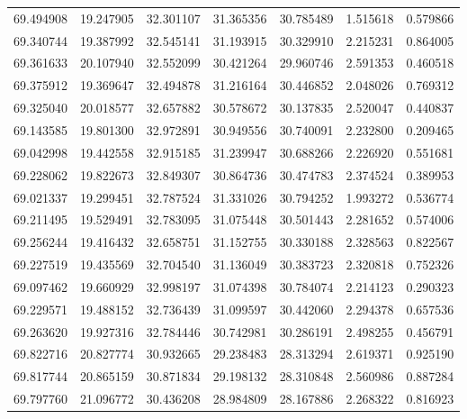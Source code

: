 \begin{tabular}{rrrrrrr}
 69.494908 &  19.247905 &         32.301107 &         31.365356 &         30.785489 &  1.515618 &  0.579866 \\
 69.340744 &  19.387992 &         32.545141 &         31.193915 &         30.329910 &  2.215231 &  0.864005 \\
 69.361633 &  20.107940 &         32.552099 &         30.421264 &         29.960746 &  2.591353 &  0.460518 \\
 69.375912 &  19.369647 &         32.494878 &         31.216164 &         30.446852 &  2.048026 &  0.769312 \\
 69.325040 &  20.018577 &         32.657882 &         30.578672 &         30.137835 &  2.520047 &  0.440837 \\
 69.143585 &  19.801300 &         32.972891 &         30.949556 &         30.740091 &  2.232800 &  0.209465 \\
 69.042998 &  19.442558 &         32.915185 &         31.239947 &         30.688266 &  2.226920 &  0.551681 \\
 69.228062 &  19.822673 &         32.849307 &         30.864736 &         30.474783 &  2.374524 &  0.389953 \\
 69.021337 &  19.299451 &         32.787524 &         31.331026 &         30.794252 &  1.993272 &  0.536774 \\
 69.211495 &  19.529491 &         32.783095 &         31.075448 &         30.501443 &  2.281652 &  0.574006 \\
 69.256244 &  19.416432 &         32.658751 &         31.152755 &         30.330188 &  2.328563 &  0.822567 \\
 69.227519 &  19.435569 &         32.704540 &         31.136049 &         30.383723 &  2.320818 &  0.752326 \\
 69.097462 &  19.660929 &         32.998197 &         31.074398 &         30.784074 &  2.214123 &  0.290323 \\
 69.229571 &  19.488152 &         32.736439 &         31.099597 &         30.442060 &  2.294378 &  0.657536 \\
 69.263620 &  19.927316 &         32.784446 &         30.742981 &         30.286191 &  2.498255 &  0.456791 \\
 69.822716 &  20.827774 &         30.932665 &         29.238483 &         28.313294 &  2.619371 &  0.925190 \\
 69.817744 &  20.865159 &         30.871834 &         29.198132 &         28.310848 &  2.560986 &  0.887284 \\
 69.797760 &  21.096772 &         30.436208 &         28.984809 &         28.167886 &  2.268322 &  0.816923 \\

\end{tabular}
